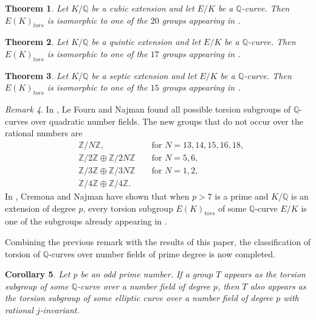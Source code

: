 \documentclass[10pt,leqno]{amsart}
\newcommand{\Z}{\mathbb{Z}}
\newcommand{\Q}{\mathbb{Q}}
\newtheorem{theorem}{Theorem}[]
\newtheorem{corollary}[theorem]{Corollary}
\theoremstyle{definition}
\theoremstyle{remark}
\newtheorem{remark}[theorem]{Remark}
\numberwithin{theorem}{section}
\begin{document}
\begin{theorem}\label{mainresult}
        Let $K/\Q$ be a cubic extension and let $E/K$ be a $\Q$-curve. Then $E(K)_{tors}$ is isomorphic to one of the  $20$ groups appearing in .
\end{theorem}

\begin{theorem}\label{mainresult5}
    Let $K/\Q$ be a quintic extension and let $E/K$ be a $\Q$-curve. Then $E(K)_{tors}$ is isomorphic to one of the $17$ groups appearing in .
\end{theorem}

\begin{theorem}\label{mainresult7}
    Let $K/\Q$ be a septic extension and let $E/K$ be a $\Q$-curve. Then $E(K)_{tors}$ is isomorphic to one of the $15$ groups appearing in .
\end{theorem}


\begin{remark}
    In \cite{lefourn}, Le Fourn and Najman found all possible torsion subgroups of $\Q$-curves over quadratic number fields. The new groups that do not occur over the rational numbers are \begin{align*}
        &\Z/N\Z, && \text{ for } N=13,14,15,16,18, \\
        &\Z/2\Z \oplus \Z/2N\Z && \text{ for } N=5,6, \\
        &\Z/3\Z\oplus \Z/3N\Z && \text{ for } N=1,2, \\
        &\Z/4\Z \oplus \Z/4\Z. &&
    \end{align*}  
        In \cite[Theorem 1.3.]{cremona-najman}, Cremona and Najman have shown that when $p>7$ is a prime and $K/\Q$ is an extension of degree $p$, every torsion subgroup $E(K)_{tors}$ of some $\Q$-curve $E/K$ is one of the subgroups already appearing in .
\end{remark}
Combining the previous remark with the results of this paper, the classification of torsion of $\Q$-curves over number fields of prime degree is now completed.


\begin{corollary}\label{korolarglavnog}
    Let $p$ be an odd prime number. If a group $T$ appears as the torsion subgroup of some $\Q$-curve over a number field of degree $p$, then $T$ also appears as the torsion subgroup of some elliptic curve over a number field of degree $p$ with rational $j$-invariant.
\end{corollary}
\end{document}

